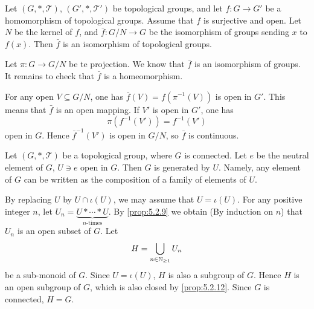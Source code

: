 \begin{propositionenv}
    Let $(G,*,\mathscr{T})$, $(G',*,\mathscr{T}')$ be topological groups,
    and let $f : G \rightarrow G'$ be a homomorphism of topological groups.
    Assume that $f$ is surjective and open.
    Let $N$ be the kernel of $f$,
    and $\bar{f} : G/N \rightarrow G$ be the isomorphism of groups sending $x$ to $f(x)$.
    Then $\bar{f}$ is an isomorphism of topological groups.
    \begin{center}
    \end{center}
\end{propositionenv}
\begin{proofenv}
    Let $\pi : G \rightarrow G/N$ be te projection.
    We know that $\bar{f}$ is an isomorphism of groups.
    It remains to check that $\bar{f}$ is a homeomorphism.

    \quad For any open $V \subseteq G/N$, one has $\bar{f} (V) = f(\pi^{-1}(V))$ is open in $G'$.
    This means that $\bar{f}$ is an open mapping.
    If $V'$ is open in $G'$,
    one has
    $$ \pi\left(f^{-1} (V')\right) = f^{-1} (V')$$
    open in $G$.
    Hence $\bar{f}^{-1}(V')$ is open in $G/N$,
    so $\bar{f}$ is continuous.
\end{proofenv}

\begin{propositionenv}
    Let $(G,*,\mathscr{T})$ be a topological group, where $G$ is connected.
    Let $e$ be the neutral element of $G$, $U \ni e$ open in $G$.
    Then $G$ is generated by $U$.
    Namely, any element of $G$ can be written as the composition of a family of elements of $U$.
\end{propositionenv}
\begin{proofenv}
    By replacing $U$ by $U \cap \iota(U)$, we may assume that $U = \iota(U)$.
    For any positive integer $n$, let $U_n = \underset{n\text{-times}}{\underbrace{U*\cdots*U}}$.
    By \ref{prop:5.2.9} we obtain (By induction on $n$) that $U_n$ is an open subset of $G$.
    Let 
    $$H = \bigcup_{n\in \mathbb{N}_{\ge 1}} U_n$$
    be a sub-monoid of $G$.
    Since $U = \iota(U)$, $H$ is also a subgroup of $G$.
    Hence $H$ is an open subgroup of $G$, which is also closed by \ref{prop:5.2.12}.
    Since $G$ is connected, $H = G$.
\end{proofenv}

